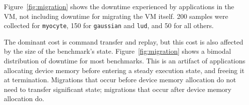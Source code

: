 Figure~\ref{fig:migration} shows the downtime experienced by applications in the VM, not including downtime for migrating the VM itself.
200 samples were collected for \texttt{myocyte}, 150 for \texttt{gaussian} and \texttt{lud}, and 50 for all others.

The dominant cost is command transfer and replay, but this cost is also affected by the size of the benchmark's state.
Figure~\ref{fig:migration} shows a bimodal distribution of downtime for most benchmarks. This is an artifact of applications allocating device memory before entering a steady execution state, and freeing it at termination.
Migrations that occur before device memory allocation do not need to transfer significant state; migrations that occur after device memory allocation do.


